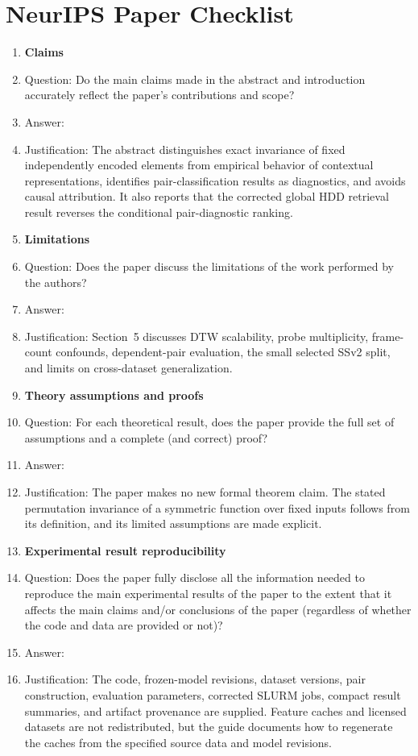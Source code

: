\section*{NeurIPS Paper Checklist}

\begin{enumerate}

\item {\bf Claims}
    \item[] Question: Do the main claims made in the abstract and introduction accurately reflect the paper's contributions and scope?
    \item[] Answer: \answerYes{}
    \item[] Justification: The abstract distinguishes exact invariance of fixed independently encoded elements from empirical behavior of contextual representations, identifies pair-classification results as diagnostics, and avoids causal attribution. It also reports that the corrected global HDD retrieval result reverses the conditional pair-diagnostic ranking.

\item {\bf Limitations}
    \item[] Question: Does the paper discuss the limitations of the work performed by the authors?
    \item[] Answer: \answerYes{}
    \item[] Justification: Section~5 discusses DTW scalability, probe multiplicity, frame-count confounds, dependent-pair evaluation, the small selected SSv2 split, and limits on cross-dataset generalization.

\item {\bf Theory assumptions and proofs}
    \item[] Question: For each theoretical result, does the paper provide the full set of assumptions and a complete (and correct) proof?
    \item[] Answer: \answerNA{}
    \item[] Justification: The paper makes no new formal theorem claim. The stated permutation invariance of a symmetric function over fixed inputs follows from its definition, and its limited assumptions are made explicit.

    \item {\bf Experimental result reproducibility}
    \item[] Question: Does the paper fully disclose all the information needed to reproduce the main experimental results of the paper to the extent that it affects the main claims and/or conclusions of the paper (regardless of whether the code and data are provided or not)?
    \item[] Answer: \answerYes{}
    \item[] Justification: The code, frozen-model revisions, dataset versions, pair construction, evaluation parameters, corrected SLURM jobs, compact result summaries, and artifact provenance are supplied. Feature caches and licensed datasets are not redistributed, but the guide documents how to regenerate the caches from the specified source data and model revisions.


\end{enumerate}
